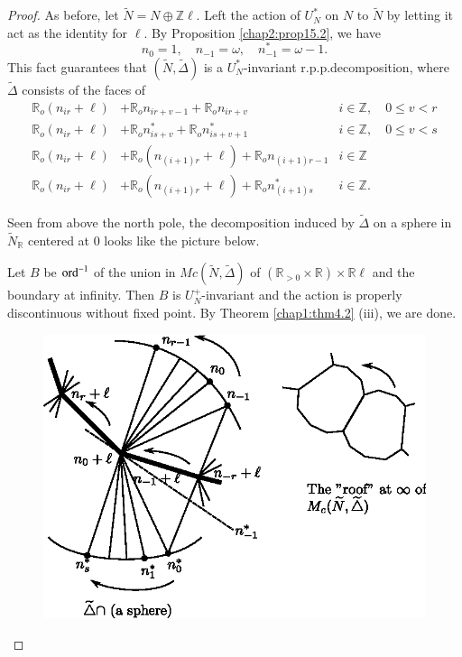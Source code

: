\begin{proof}
As before, let $\tilde{N}=N \oplus \mathbb{Z}\ell$. Left the action of
$U^*_N$ on $N$ to $\tilde{N}$ by letting it act as the identity for
$\ell$. By Proposition \ref{chap2:prop15.2}, we have 
$$
n_0=1, \quad n_{-1}=\omega, \quad n^*_{-1}=\omega -1.
$$
This fact guarantees that $(\tilde{N}, \tilde{\Delta})$ is a
$U^*_N$-invariant r.p.p.decomposition, where $\tilde{\Delta}$
consists of the faces of 
\begin{align*}
\mathbb{R}_o(n_{ir}+\ell) &+ \mathbb{R}_on_{ir+v-1}+\mathbb{R}_on_{ir+v}  &i
\in \mathbb{Z} , \quad  0 \le v < r\\ 
\mathbb{R}_o(n_{ir}+\ell) &+ \mathbb{R}_o n^*_{is+v}+\mathbb{R}_o
n^*_{is+v+1}  &i \in \mathbb{Z} , \quad 0 \le v < s\\ 
\mathbb{R}_o(n_{ir}+\ell) &+  \mathbb{R}_o(n_{(i+1)r}+\ell)+
\mathbb{R}_on_{(i+1)r-1}  &i \in  \mathbb{Z}\\ 
\mathbb{R}_o(n_{ir}+\ell) &+ \mathbb{R}_o(n_{(i+1)r}+\ell)+
\mathbb{R}_o n^*_{(i+1)s} & i\in  \mathbb{Z}. 
\end{align*}

Seen from above the north pole, the decomposition induced by
$\tilde{\Delta}$ on a sphere in $\tilde{N}_\mathbb{R}$ centered at 0
looks like the picture below. 

Let $B$ be $\operatorname{ord}^{-1}$ of the union in $Mc(\tilde{N}, \tilde{\Delta})$
of $(\mathbb{R}_{>0} \times \mathbb{R}) \times \mathbb{R} \ell$ and
the boundary at infinity. Then $B$ is $U^+_N$-invariant and the action
is properly discontinuous without fixed point. By Theorem
\ref{chap1:thm4.2} (iii), we are done.  
\begin{figure}[H]
\centering 
\includegraphics{vol58-fig/fig58-83.eps} 
\end{figure}
\end{proof}\pageoriginale

